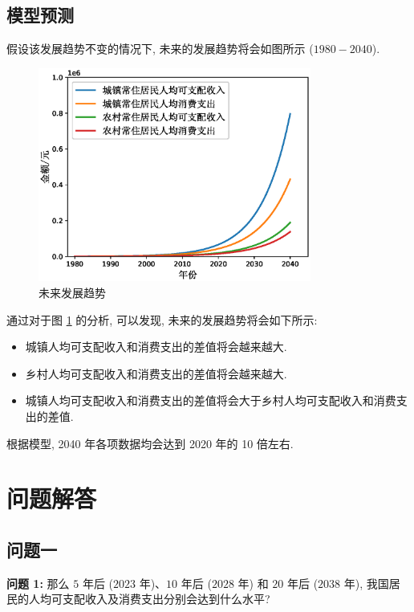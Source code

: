 \documentclass{article}
\begin{document}
\subsection{模型预测}

\indent 假设该发展趋势不变的情况下, 未来的发展趋势将会如图所示 ($1980-2040$).

\begin{figure}[H]
  \centering
  \includegraphics[width=0.8\textwidth]{figures/result1.eps}
  \caption{未来发展趋势}
  \label{fig:side:d}
\end{figure}

\indent 通过对于图 \ref{fig:side:d} 的分析, 可以发现, 未来的发展趋势将会如下所示:
\begin{itemize}
  \item 城镇人均可支配收入和消费支出的差值将会越来越大.
  \item 乡村人均可支配收入和消费支出的差值将会越来越大.
  \item 城镇人均可支配收入和消费支出的差值将会大于乡村人均可支配收入和消费支出的差值.
\end{itemize}

根据模型, 2040 年各项数据均会达到 2020 年的 10 倍左右.\\

\section{问题解答}

\subsection{问题一}

\begin{mdframed}
\fangsong
\textbf{问题 1:} 那么 $5$ 年后 ($2023$ 年)、$10$ 年后 ($2028$ 年) 和 $20$ 年后 ($2038$ 年), 我国居民的人均可支配收入及消费支出分别会达到什么水平?
\end{mdframed}
\end{document}
